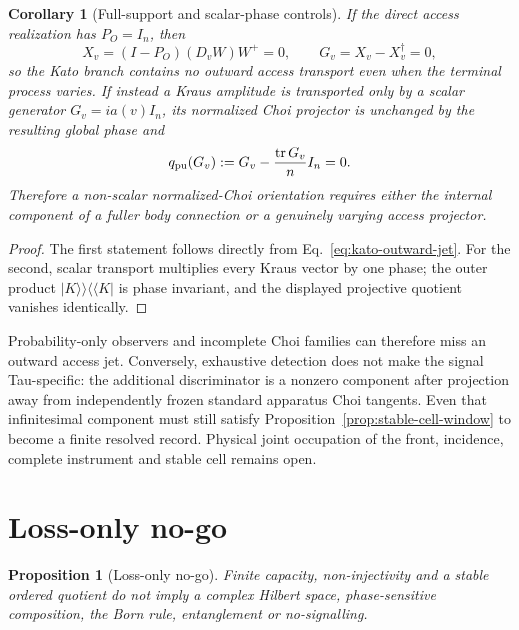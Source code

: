 \documentclass[11pt]{article}
\newtheorem{proposition}{Proposition}
\newtheorem{corollary}{Corollary}
\begin{document}
\begin{corollary}[Full-support and scalar-phase controls]
\label{cor:full-support-scalar-controls}
If the direct access realization has \(P_O=I_n\), then
\begin{equation}
 X_v=(I-P_O)(D_vW)W^+=0,
 \qquad G_v=X_v-X_v^\dagger=0,
 \label{eq:full-support-kato-zero}
\end{equation}
so the Kato branch contains no outward access transport even when the terminal
process varies.  If instead a Kraus amplitude is transported only by a scalar
generator \(G_v=ia(v)I_n\), its normalized Choi projector is unchanged by the
resulting global phase and
\begin{equation}
 q_{\rm pu}(G_v)
 :=G_v-\frac{\operatorname{tr}G_v}{n}I_n=0.
 \label{eq:scalar-choi-null}
\end{equation}
Therefore a non-scalar normalized-Choi orientation requires either the
internal component of a fuller body connection or a genuinely varying access
projector.
\end{corollary}

\begin{proof}
The first statement follows directly from Eq.~\eqref{eq:kato-outward-jet}.
For the second, scalar transport multiplies every Kraus vector by one phase;
the outer product \(\lvert K\rangle\!\rangle\langle\!\langle K\rvert\) is
phase invariant, and the displayed projective quotient vanishes identically.
\end{proof}

Probability-only observers and incomplete Choi families can therefore miss
an outward access jet.  Conversely, exhaustive detection does not make the
signal Tau-specific: the additional discriminator is a nonzero component
after projection away from independently frozen standard apparatus Choi
tangents.  Even that infinitesimal component must still satisfy
Proposition~\ref{prop:stable-cell-window} to become a finite resolved record.
Physical joint occupation of the front, incidence, complete instrument and
stable cell remains open.

\section{Loss-only no-go}

\begin{proposition}[Loss-only no-go]
\label{prop:nogo}
Finite capacity, non-injectivity and a stable ordered quotient do not imply a
complex Hilbert space, phase-sensitive composition, the Born rule,
entanglement or no-signalling.
\end{proposition}
\end{document}
